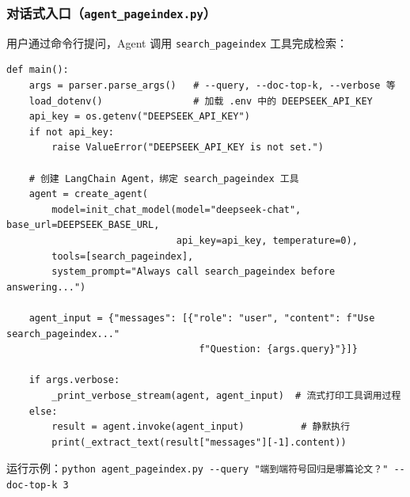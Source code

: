 \documentclass[presentation,aspectratio=169]{ctexbeamer}
\begin{document}
\begin{frame}[fragile]
\frametitle{对话式入口（\texttt{agent\_pageindex.py}）}
{\scriptsize 用户通过命令行提问，Agent 调用 \texttt{search\_pageindex} 工具完成检索：}

\vspace{0.05cm}
{\tiny
\begin{verbatim}
def main():
    args = parser.parse_args()   # --query, --doc-top-k, --verbose 等
    load_dotenv()                # 加载 .env 中的 DEEPSEEK_API_KEY
    api_key = os.getenv("DEEPSEEK_API_KEY")
    if not api_key:
        raise ValueError("DEEPSEEK_API_KEY is not set.")

    # 创建 LangChain Agent，绑定 search_pageindex 工具
    agent = create_agent(
        model=init_chat_model(model="deepseek-chat", base_url=DEEPSEEK_BASE_URL,
                              api_key=api_key, temperature=0),
        tools=[search_pageindex],
        system_prompt="Always call search_pageindex before answering...")

    agent_input = {"messages": [{"role": "user", "content": f"Use search_pageindex..."
                                  f"Question: {args.query}"}]}

    if args.verbose:
        _print_verbose_stream(agent, agent_input)  # 流式打印工具调用过程
    else:
        result = agent.invoke(agent_input)          # 静默执行
        print(_extract_text(result["messages"][-1].content))
\end{verbatim}}

\vspace{0.05cm}
{\scriptsize 运行示例：\texttt{python agent\_pageindex.py -{}-query "端到端符号回归是哪篇论文？" -{}-doc-top-k 3}}
\end{frame}

\end{document}
